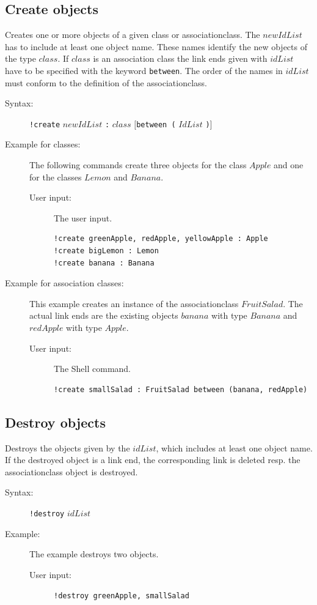 \documentclass[a4paper,titlepage,oneside,final]{scrreprt} %
\begin{document}
\subsection{Create objects}\label{createObjects}
Creates one or more objects of a given class or associationclass.
The $\mathit{newIdList}$ has to include at least one object name. These names
identify the new objects of the type $\mathit{class}$. If $\mathit{class}$ is an
association class the link ends given with $\mathit{idList}$ have to be specified with
the keyword \verb+between+.
The order of the names in $\mathit{idList}$ must conform to the definition of
the associationclass.
\begin{description}
\item[Syntax:] \verb+!create+ $\mathit{newIdList}$ \verb+:+ $\mathit{class}$ $[$\verb+between (+ $\mathit{IdList}$ \verb+)+$]$
\item[Example for classes:] The following commands create three objects for
the class $\mathit{Apple}$ and one for the classes $\mathit{Lemon}$ and $\mathit{Banana}$.
\begin{description}
\item[User input:] The user input.
\begin{verbatim}
!create greenApple, redApple, yellowApple : Apple
!create bigLemon : Lemon
!create banana : Banana
\end{verbatim}
\end{description}
\item[Example for association classes:] This example creates an instance of the associationclass $\mathit{FruitSalad}$.
The actual link ends are the existing objects $\mathit{banana}$ with type
$\mathit{Banana}$ and $\mathit{redApple}$ with type $\mathit{Apple}$.
\begin{description}
\item[User input:] The Shell command.
\begin{verbatim}
!create smallSalad : FruitSalad between (banana, redApple)
\end{verbatim}
\end{description}
\end{description}
\subsection{Destroy objects}
Destroys the objects given by the $\mathit{idList}$, which includes at least one object name.
If the destroyed object is a link end, the corresponding link is deleted resp. the associationclass object is
destroyed.
\begin{description}
\item[Syntax:] \verb+!destroy+ $\mathit{idList}$
\item[Example:] The example destroys two objects.
\begin{description}
\item[User input:] \verb+!destroy greenApple, smallSalad+
\end{description}
\end{description}
\end{document}
